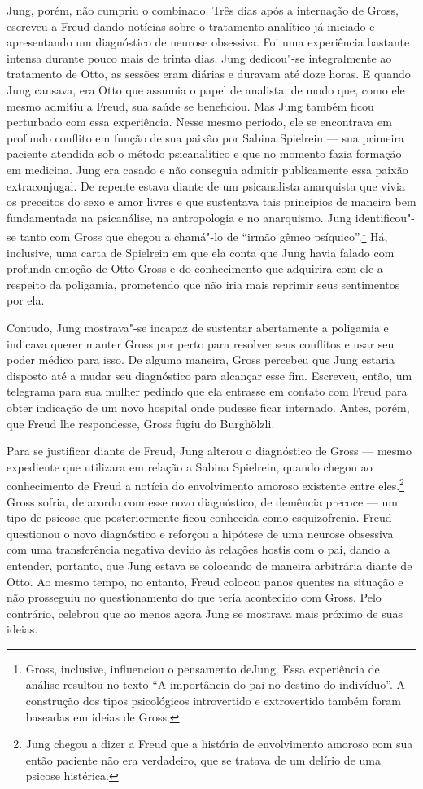 Jung, porém, não cumpriu o combinado. Três dias após a internação de
Gross, escreveu a Freud dando notícias sobre o tratamento analítico já
iniciado e apresentando um diagnóstico de neurose obsessiva. Foi uma
experiência bastante intensa durante pouco mais de trinta dias. Jung
dedicou"-se integralmente ao tratamento de Otto, as sessões eram diárias
e duravam até doze horas. E quando Jung cansava, era Otto que assumia o
papel de analista, de modo que, como ele mesmo admitiu a Freud, sua
saúde se beneficiou. Mas Jung também ficou perturbado com essa
experiência. Nesse mesmo período, ele se encontrava em profundo conflito
em função de sua paixão por Sabina Spielrein --- sua primeira paciente
atendida sob o método psicanalítico e que no momento fazia formação em
medicina. Jung era casado e não conseguia admitir publicamente essa
paixão extraconjugal. De repente estava diante de um psicanalista
anarquista que vivia os preceitos do sexo e amor livres e que sustentava
tais princípios de maneira bem fundamentada na psicanálise, na
antropologia e no anarquismo. Jung identificou"-se tanto com Gross que
chegou a chamá"-lo de ``irmão gêmeo psíquico''.\footnote{Gross, inclusive,
  influenciou o pensamento deJung. Essa experiência de análise resultou
  no texto ``A importância do pai no destino do indivíduo''. A
  construção dos tipos psicológicos introvertido e extrovertido também
  foram baseadas em ideias de Gross.} Há, inclusive, uma carta de
Spielrein em que ela conta que Jung havia falado com profunda emoção de
Otto Gross e do conhecimento que adquirira com ele a respeito da
poligamia, prometendo que não iria mais reprimir seus sentimentos por
ela.

Contudo, Jung mostrava"-se incapaz de sustentar abertamente a poligamia e
indicava querer manter Gross por perto para resolver seus conflitos e
usar seu poder médico para isso. De alguma maneira, Gross percebeu que
Jung estaria disposto até a mudar seu diagnóstico para alcançar esse
fim. Escreveu, então, um telegrama para sua mulher pedindo que ela
entrasse em contato com Freud para obter indicação de um novo hospital
onde pudesse ficar internado. Antes, porém, que Freud lhe respondesse,
Gross fugiu do Burghölzli.

Para se justificar diante de Freud, Jung alterou o diagnóstico de Gross
--- mesmo expediente que utilizara em relação a Sabina Spielrein, quando
chegou ao conhecimento de Freud a notícia do envolvimento amoroso
existente entre eles.\footnote{Jung chegou a dizer a Freud que a história
  de envolvimento amoroso com sua então paciente não era verdadeiro, que
  se tratava de um delírio de uma psicose histérica.} Gross sofria, de
acordo com esse novo diagnóstico, de demência precoce --- um tipo de
psicose que posteriormente ficou conhecida como esquizofrenia. Freud
questionou o novo diagnóstico e reforçou a hipótese de uma neurose
obsessiva com uma transferência negativa devido às relações hostis com o
pai, dando a entender, portanto, que Jung estava se colocando de maneira
arbitrária diante de Otto. Ao mesmo tempo, no entanto, Freud colocou
panos quentes na situação e não prosseguiu no questionamento do que
teria acontecido com Gross. Pelo contrário, celebrou que ao menos agora
Jung se mostrava mais próximo de suas ideias.

